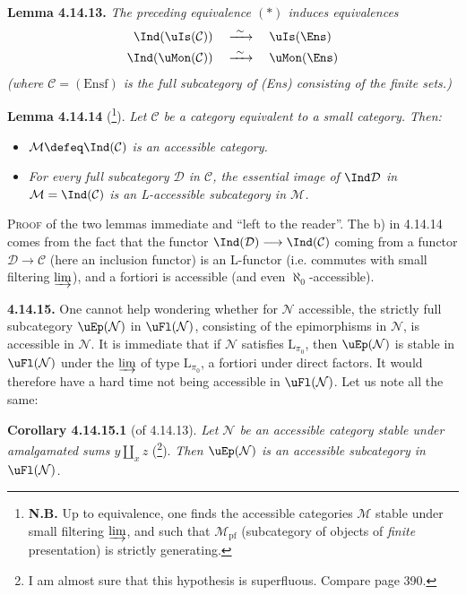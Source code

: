 \textbf{Lemma 4.14.13.} \textit{The preceding equivalence $(*)$ induces equivalences}
\[
\begin{aligned}
\Ind(\uIs(\mathcal{C})) \quad &\xrightarrow{\ \sim\ } \quad \uIs(\Ens) \\
\Ind(\uMon(\mathcal{C})) \quad &\xrightarrow{\ \sim\ } \quad \uMon(\Ens)
\end{aligned}
\]
\textit{(where $\mathcal{C} = (\mathrm{Ensf})$ is the full subcategory of \textup{(Ens)} consisting of the \textup{finite} sets.)}

\textbf{Lemma 4.14.14} (\footnote[166]{\textbf{N.B.} Up to equivalence, one finds the accessible categories $\mathcal{M}$ stable under small filtering $\varinjlim$, and such that $\mathcal{M}_{\mathrm{pf}}$ (subcategory of objects of \textit{finite} presentation) is strictly generating.}). \textit{Let $\mathcal{C}$ be a category equivalent to a small category. Then:}
\begin{itemize}[nosep]
\item[\textit{a)}] \textit{$\mathcal{M} \defeq \Ind(\mathcal{C})$ is an accessible category.}
\item[\textit{b)}] \textit{For every full subcategory $\mathcal{D}$ in $\mathcal{C}$, the essential image of $\Ind\mathcal{D}$ in $\mathcal{M} = \Ind(\mathcal{C})$ is an L-accessible subcategory in $\mathcal{M}$.}
\end{itemize}
\textsc{Proof} of the two lemmas immediate and ``left to the reader''. The b) in 4.14.14 comes from the fact that the functor $\Ind(\mathcal{D}) \longrightarrow \Ind(\mathcal{C})$ coming from a functor $\mathcal{D} \longrightarrow \mathcal{C}$ (here an
inclusion functor) is an L-functor (i.e. commutes with small filtering $\varinjlim$), and a fortiori is accessible (and even $\aleph_0$-accessible).

\textbf{4.14.15.} One cannot help wondering whether for $\mathcal{N}$ accessible, the strictly full subcategory $\uEp(\mathcal{N})$ in $\uFl(\mathcal{N})$, consisting of the epimorphisms in $\mathcal{N}$, is accessible in $\mathcal{N}$. It is immediate that if $\mathcal{N}$ satisfies $\mathrm{L}_{\pi_0}$, then $\uEp(\mathcal{N})$ is stable in $\uFl(\mathcal{N})$ under the $\varinjlim$ of type $\mathrm{L}_{\pi_0}$, a fortiori under direct factors. It would therefore have a hard time not being accessible in $\uFl(\mathcal{N})$. Let us note all the same: %

\textbf{Corollary 4.14.15.1} (of 4.14.13). \textit{Let $\mathcal{N}$ be an accessible category stable under amalgamated sums $y \amalg_x z$} (\footnote[167]{I am almost sure that this hypothesis is superfluous. Compare page 390.}). \textit{Then $\uEp(\mathcal{N})$ is an accessible subcategory in $\uFl(\mathcal{N})$.}

